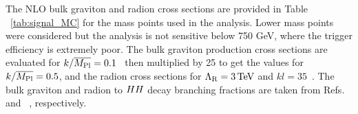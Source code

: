 The NLO bulk graviton and radion cross sections are provided in Table ~\ref{tab:signal_MC} for the mass points used in the analysis. Lower mass points were considered but the analysis is not sensitive below 750 GeV, where the trigger efficiency is extremely poor. 
The bulk graviton production cross sections are evaluated for $k/\overline{{M_\mathrm{Pl}}} = 0.1$~\cite{WED_BG_13TeV} then multiplied by 25 to get the values for $k/\overline{{M_\mathrm{Pl}}} = 0.5$, and the radion cross sections for $\Lambda_{\rm R} = 3\,\text{Te\hspace{-.08em}V}$ and $kl = 35$~\cite{WED_radion_13TeV}. 
The bulk graviton and radion to $HH$ decay branching fractions are taken from Refs.~\cite{WED_BGHHDecay_13TeV} and ~\cite{WED_radionHHDecay_13TeV}, respectively. 
